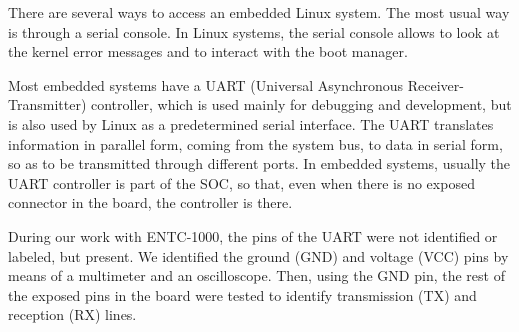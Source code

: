\documentclass[conference]{IEEEtran}
\newcommand{\nota}[1]{}
\begin{document}
There are several ways to access an embedded Linux system. The most usual way is through a serial console. In Linux systems, the serial console allows to look at the kernel error messages and to interact with the boot manager.

\nota{ La mayoría de los sistemas embebidos contienen un controlador 
UART (del inglés ``Universal Asynchronous Receiver-Transmitter''),
utilizado principalmente para depuración y desarrollo.
Pero que también es utilizado por Linux como la interfaz serie
predeterminada.
El UART traduce la información en formato paralelo
provenientes del bus del sistema, a datos en formato serie,
para que puedan ser transmitidos a través de diferentes puertos.
En los sistemas embebidos, generalmente, el controlador UART es parte de la CPU,
por lo que, aunque no exista un conector expuesto en la placa, generalmente
está presente.
}

Most embedded systems have a UART (Universal Asynchronous Receiver-Transmitter) controller, which is used mainly for debugging and development, but is also used by Linux as a predetermined serial interface. The UART translates information in parallel form, coming from the system bus, to data in serial form, so as to be transmitted through different ports. In embedded systems, usually the UART controller is part of the SOC, so that, even when there is no exposed connector in the board, the controller is there. 

\nota{
En nuestro trabajo con el ENTC-1000, los contactos (en inglés ``pins'') del UART
no se encontraban identificados o etiquetados, pero estaban presentes.
Utilizando un multímetro y un osciloscopio, se identificaron contactos
de tierra (GND) y de voltaje de corriente directa (VCC). Luego, utilizando
el contacto tierra, se probaron los demás contactos expuestos en la placa,
para identificar el contacto de transmisión (TX), y recepción (RX).
}
During our work with ENTC-1000, the pins of the UART were not identified or labeled, but present. We identified the ground (GND) and voltage (VCC) pins by means of a multimeter and an oscilloscope. Then, using the GND pin, the rest of the exposed pins in the board were tested to identify transmission (TX) and reception (RX) lines.
   
\nota {Para corroborar que los contactos del UART son los correctos, se conectó
el conversor de nivel RS-232 a los mismos, y luego a una PC.
Finalmente, se utilizó el programa de comunicaciones minicom para
obtener, al menos, información visual sin sentido, ya que
no se conocía a que velocidad de transmisión se encuentra operando
el firmware original.
}
\end{document}
